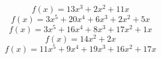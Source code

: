 \documentclass{article}
\begin{document}
  \[ f(x) =
            13x  ^{ 3 }            +
          2x  ^{ 2 }            +
          11x     \]
  \[ f(x) =
            3x  ^{ 5 }            +
          20x  ^{ 4 }            +
          6x  ^{ 3 }            +
          2x  ^{ 2 }            +
          5x     \]
  \[ f(x) =
            3x  ^{ 5 }            +
          16x  ^{ 4 }            +
          8x  ^{ 3 }            +
          17x  ^{ 2 }            +
          1x     \]
  \[ f(x) =
            14x  ^{ 2 }            +
          2x     \]
  \[ f(x) =
            11x  ^{ 5 }            +
          9x  ^{ 4 }            +
          19x  ^{ 3 }            +
          16x  ^{ 2 }            +
          17x     \]
\end{document}
